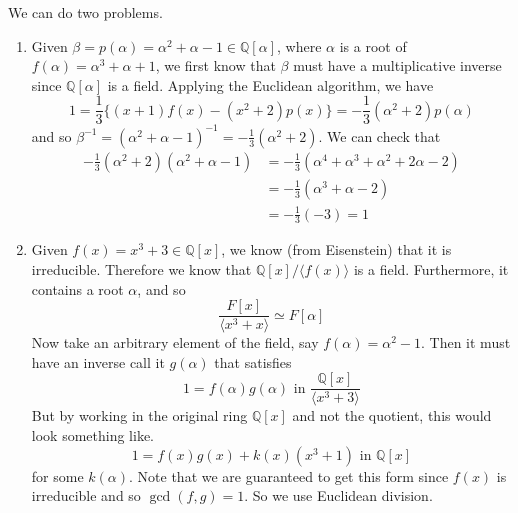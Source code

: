   \begin{example}
    We can do two problems. 
    \begin{enumerate}
      \item Given $\beta = p(\alpha) = \alpha^2 + \alpha - 1 \in \mathbb{Q}[\alpha]$, where $\alpha$ is a root of $f(\alpha) = \alpha^3 + \alpha + 1$, we first know that $\beta$ must have a multiplicative inverse since $\mathbb{Q}[\alpha]$ is a field. Applying the Euclidean algorithm, we have 
      \begin{equation}
        1 = \frac{1}{3} \big\{ (x+1) f(x) - (x^2 + 2) p(x)\big\} = -\frac{1}{3} (\alpha^2 + 2) p(\alpha)
      \end{equation}
      and so $\beta^{-1} = (\alpha^2 + \alpha - 1)^{-1} = -\frac{1}{3} (\alpha^2 + 2)$. We can check that 
      \begin{align}
        -\frac{1}{3} (\alpha^2 + 2) (\alpha^2 + \alpha - 1) & = -\frac{1}{3} (\alpha^4 + \alpha^3 + \alpha^2 + 2 \alpha - 2) \\
                                                            & = -\frac{1}{3} (\alpha^3 + \alpha - 2) \\
                                                            & = -\frac{1}{3} (-3) = 1
      \end{align}
      \item Given $f(x) = x^3 + 3 \in \mathbb{Q}[x]$, we know (from Eisenstein) that it is irreducible. Therefore we know that $\mathbb{Q}[x]/\langle f(x) \rangle$ is a field. Furthermore, it contains a root $\alpha$, and so 
      \begin{equation}
        \frac{F[x]}{\langle x^3 + x \rangle} \simeq F[\alpha]
      \end{equation}
      Now take an arbitrary element of the field, say $f(\alpha) = \alpha^2 - 1$. Then it must have an inverse call it $g(\alpha)$ that satisfies 
      \begin{equation}
        1 = f(\alpha) g(\alpha) \text{ in } \frac{\mathbb{Q}[x]}{\langle x^3 + 3 \rangle}
      \end{equation}
      But by working in the original ring $\mathbb{Q}[x]$ and not the quotient, this would look something like. 
      \begin{equation}
        1 = f(x) g(x) + k(x) (x^3 + 1) \text{ in } \mathbb{Q}[x]
      \end{equation} 
      for some $k(\alpha)$. Note that we are guaranteed to get this form since $f(x)$ is irreducible and so $\gcd(f, g) = 1$. So we use Euclidean division. 

\end{enumerate}
\end{example}
